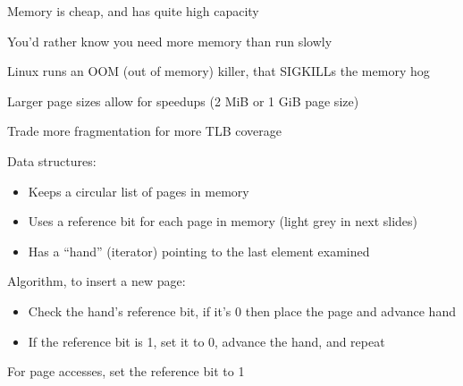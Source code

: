   \begin{slide}


    Memory is cheap, and has quite high capacity

    \leftspace{}You'd rather know you need more memory than run slowly

    \leftspace{}\leftspace{}Linux runs an OOM (out of memory) killer, that
    SIGKILLs the memory hog
    \medskip

    Larger page sizes allow for speedups (2 MiB or 1 GiB page size)

    \leftspace{}Trade more fragmentation for more TLB coverage

  \end{slide}

  \begin{slide}


    Data structures:
    \begin{itemize}
      \item Keeps a circular list of pages in memory
      \item Uses a reference bit for each page in memory (light grey in next slides)
      \item Has a ``hand'' (iterator) pointing to the last element examined
    \end{itemize}
    \medskip

    Algorithm, to insert a new page:
    \begin{itemize}
      \item Check the hand's reference bit, if it's 0 then place the page and advance hand
      \item If the reference bit is 1, set it to 0, advance the hand, and repeat
    \end{itemize}
    \medskip

    For page accesses, set the reference bit to 1

  \end{slide}


